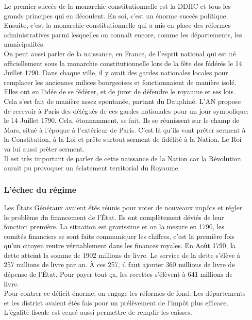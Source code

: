 \documentclass[10pt, a4paper, openany]{book}
\begin{document}
Le premier succès de la monarchie constitutionnelle est la DDHC et tous les grands principes qui en découlent. En soi, c'est un énorme succès politique. \\
Ensuite, c'est la monarchie constitutionnelle qui a mis en place des réformes administratives parmi lesquelles on connaît encore, comme les départements, les municipalités. \\
On peut aussi parler de la naissance, en France, de l'esprit national qui est né officiellement sous la monarchie constitutionnelle lors de la fête des fédérés le 14 Juillet 1790. Dans chaque ville, il y avait des gardes nationales locales pour remplacer les anciennes milices bourgeoises et fonctionnaient de manière isolé. Elles ont eu l'idée de se fédérer, et de jurer de défendre le royaume et ses lois. Cela s'est fait de manière assez spontanée, partant du Dauphiné. L'AN propose de recevoir à Paris des délégués de ces gardes nationales pour un jour symbolique: le 14 Juillet 1790. Cela, étonnamment, se fait. Ils se réunissent sur le champ de Mars, situé à l'époque à l'extérieur de Paris. C'est là qu'ils vont prêter serment à la Constitution, à la Loi et prête surtout serment de fidélité à la Nation. Le Roi va lui aussi prêter serment. \\
Il est très important de parler de cette naissance de la Nation car la Révolution aurait pu provoquer un éclatement territorial du Royaume. 

\subsubsection{L'échec du régime}

Les États Généraux avaient étés réunis pour voter de nouveaux impôts et régler le problème du financement de l'État. Ils ont complètement déviés de leur fonction première. La situation est gravissime et on la mesure en 1790, les comités financiers se sont faits communiquer les chiffres, c'est la première fois qu'un citoyen rentre véritablement dans les finances royales. En Août 1790, la dette atteint la somme de 1902 millions de livre. Le service de la dette s'élève à 257 millions de livre par an. À ces 257, il faut ajouter 360 millions de livre de dépense de l'État. Pour payer tout ça, les recettes s'élèvent à 641 millions de livre. \\
Pour contrer ce déficit énorme, on engage les réformes de fond. Les départements et les district avaient étés fais pour un prélèvement de l'impôt plus efficace. L'égalité fiscale est censé aussi permettre de remplir les caisses. \\
\end{document}
